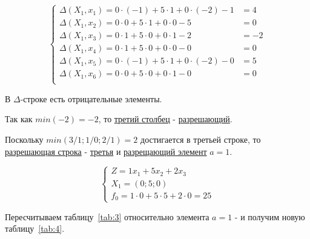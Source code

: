\begin{equation*}
  \begin{cases}
    \Delta(X_1, x_1) = 0 \cdot (-1) + 5 \cdot 1 + 0 \cdot (-2) - 1  &= 4 \\
    \Delta(X_1, x_2) = 0 \cdot 0 + 5 \cdot 1 + 0 \cdot 0 - 5        &=0 \\
    \Delta(X_1, x_3) = 0 \cdot 1 + 5 \cdot 0 + 0 \cdot 1 - 2        &= -2 \\
    \Delta(X_1, x_4) = 0 \cdot 1 + 5 \cdot 0 + 0 \cdot 0 - 0        &= 0 \\
    \Delta(X_1, x_5) = 0 \cdot (-1) + 5 \cdot 1 + 0 \cdot (-2) - 0  &= 5 \\
    \Delta(X_1, x_6) = 0 \cdot 0 + 5 \cdot 0 + 0 \cdot 1 - 0        &= 0 \\
  \end{cases}
\end{equation*}

В $\Delta$-строке есть отрицательные элементы.

Так как $min(-2) = -2$, то \underline{третий столбец} - \underline{разрешающий}.

Поскольку $min(3/1; 1/0; 2/1) = 2$ достигается в третьей строке, то \underline{разрешающая строка} -  \underline{третья}
и \underline{разрещающий элемент} $a=1$.

\begin{equation*}
  \begin{cases}
    Z = 1 x_1 + 5 x_2 + 2 x_3\\
    X_1 = (0;5;0)\\
    f_0 = 1 \cdot 0 + 5 \cdot 5 + 2 \cdot 0 = 25
  \end{cases}
\end{equation*}

Пересчитываем таблицу~\ref{tab:3} относительно элемента $a=1$ - и получим новую таблицу~\ref{tab:4}.

